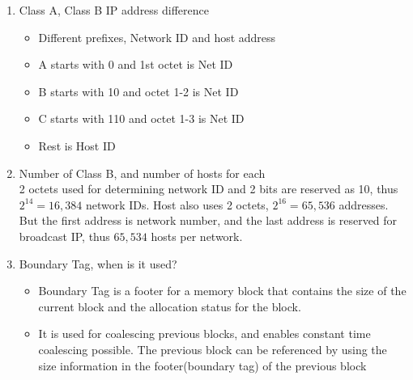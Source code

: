 \documentclass[12pt]{article}
\begin{document}
{\begin{enumerate}
\begin{itemize}
	\end{itemize}
	\item Class A, Class B IP address difference
	\begin{itemize}
		\item Different prefixes, Network ID and host address
		\item A starts with 0 and 1st octet is Net ID
		\item B starts with 10 and octet 1-2 is Net ID
		\item C starts with 110 and octet 1-3 is Net ID
		\item Rest is Host ID
	\end{itemize}
	\item Number of Class B, and number of hosts for each\\
	2 octets used for determining network ID and 2 bits are reserved as 10, thus $2^{14} = 16,384$ network IDs. Host also uses 2 octets, $2^{16}=65,536$ addresses. But the first address is network number, and the last address is reserved for broadcast IP, thus $65,534$ hosts per network.
	\item Boundary Tag, when is it used?
	\begin{itemize}
		\item Boundary Tag is a footer for a memory block that contains the size of the current block and the allocation status for the block.
		\item It is used for coalescing previous blocks, and enables constant time coalescing possible. The previous block can be referenced by using the size information in the footer(boundary tag) of the previous block
	\end{itemize}
\end{enumerate}
}
\end{document}
